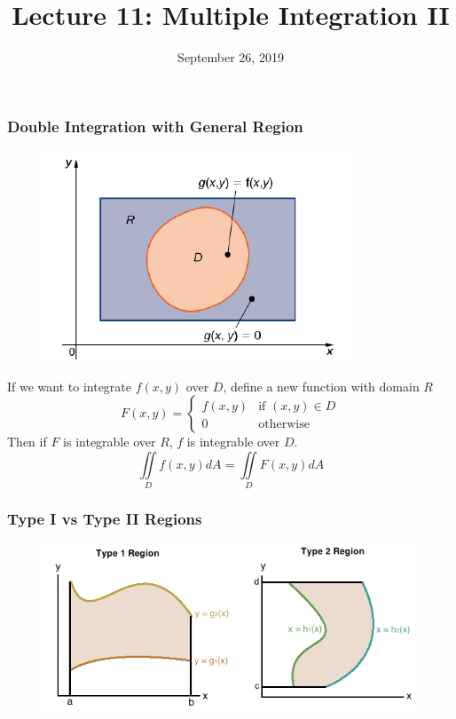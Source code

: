 \documentclass{beamer}
\title{\textbf{Lecture 11: Multiple Integration II}}
\date{September 26, 2019}
\begin{document}
	
\frame{\titlepage}


\begin{frame}
\frametitle{\textbf{Double Integration with General Region}}
\begin{figure}
	\centering
	\includegraphics[height=.35\textheight]{DR.png}\\
	\hspace*{10pt}\hbox{}
\end{figure}
If we want to integrate $f(x,y)$ over $D$, define a new function with domain $R$
$$F(x,y) = \begin{cases}
f(x,y) & \mbox{if }(x,y)\in D\\
0 & \mbox{otherwise}
\end{cases}$$
Then if $F$ is integrable over $R$, $f$ is integrable over $D$.
$$\iint\limits_{D} f(x,y)dA = \iint\limits_{D} F(x,y)dA$$
\end{frame}

\begin{frame}
\frametitle{Type I vs Type II Regions}
\begin{figure}
	
		\includegraphics[width=.95\textwidth]{image001.png}
		\hspace*{10pt}\hbox{}
\end{figure}
\end{frame}
\end{document}
